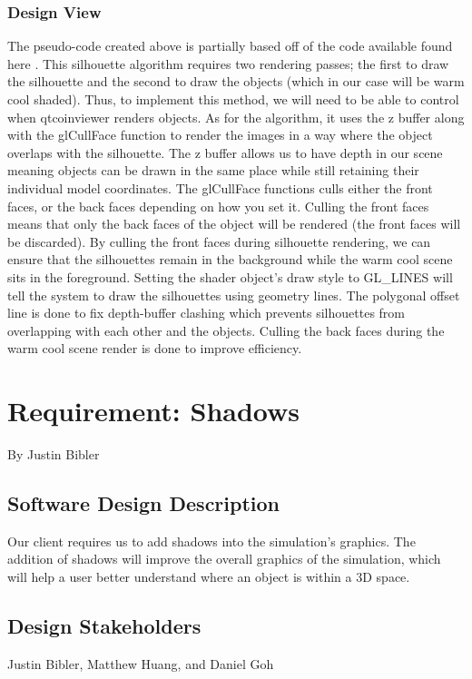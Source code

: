 \documentclass[10pt,journal,compsoc,draftclsnofoot]{IEEEtran}
\begin{document}
\begin{flushleft}
\subsubsection{Design View}
The pseudo-code created above is partially based off of the code available found here \cite{siledges}.
This silhouette algorithm requires two rendering passes; the first to draw the silhouette and the second to draw the objects (which in our case will be warm cool shaded).
Thus, to implement this method, we will need to be able to control when qtcoinviewer renders objects.
As for the algorithm, it uses the z buffer along with the glCullFace function to render the images in a way where the object overlaps with the silhouette.
The z buffer allows us to have depth in our scene meaning objects can be drawn in the same place while still retaining their individual model coordinates.
The glCullFace functions culls either the front faces, or the back faces depending on how you set it.
Culling the front faces means that only the back faces of the object will be rendered (the front faces will be discarded).
By culling the front faces during silhouette rendering, we can ensure that the silhouettes remain in the background while the warm cool scene sits in the foreground.
Setting the shader object's draw style to GL\_LINES will tell the system to draw the silhouettes using geometry lines.
The polygonal offset line is done to fix depth-buffer clashing which prevents silhouettes from overlapping with each other and the objects.
Culling the back faces during the warm cool scene render is done to improve efficiency.
\newpage

\section{Requirement: Shadows}
\large{By Justin Bibler}

\normalsize
\subsection{Software Design Description}
Our client requires us to add shadows into the simulation's graphics.
The addition of shadows will improve the overall graphics of the simulation, which will help a user better understand where an object is within a 3D space.

\subsection{Design Stakeholders}
Justin Bibler, Matthew Huang, and Daniel Goh


\end{flushleft}
\end{document}
